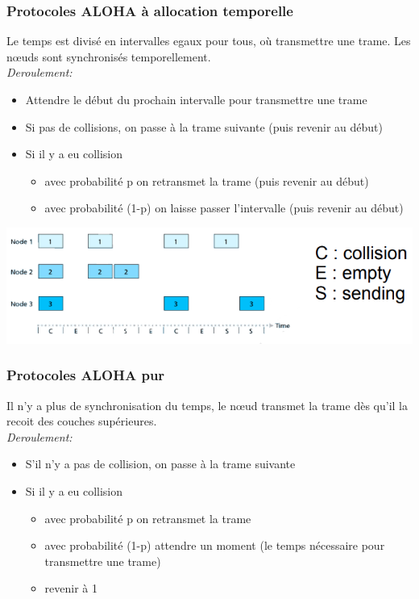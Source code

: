 \documentclass[a4paper, 12pt, french]{article}
\begin{document}
	\subsubsection{Protocoles ALOHA à allocation temporelle}

	Le temps est divisé en intervalles egaux pour tous, où transmettre une trame. Les nœuds sont synchronisés temporellement.\\

	\emph{Deroulement:}
	\begin{itemize}
		\item Attendre le début du prochain intervalle pour transmettre une trame
		\item Si pas de collisions, on passe à la trame suivante (puis revenir au début)
		\item Si il y a eu collision
		\begin{itemize}
			\item avec probabilité p on retransmet la trame (puis revenir au début)
			\item avec probabilité (1-p) on laisse passer l'intervalle (puis revenir au début)
		\end{itemize}
	\end{itemize}

	\includegraphics[width=13.8cm]{reseau_aloha}

	\subsubsection{Protocoles ALOHA pur}

	Il n'y a plus de synchronisation du temps, le nœud transmet la trame dès qu'il la recoit des couches supérieures.\\

	\emph{Deroulement:}
	\begin{itemize}
		\item S'il n'y a pas de collision, on passe à la trame suivante
		\item Si il y a eu collision
		\begin{itemize}
			\item avec probabilité p on retransmet la trame
			\item avec probabilité (1-p) attendre un moment (le temps nécessaire pour transmettre une trame)
			\item revenir à 1
		\end{itemize}
	\end{itemize}
\end{document}
